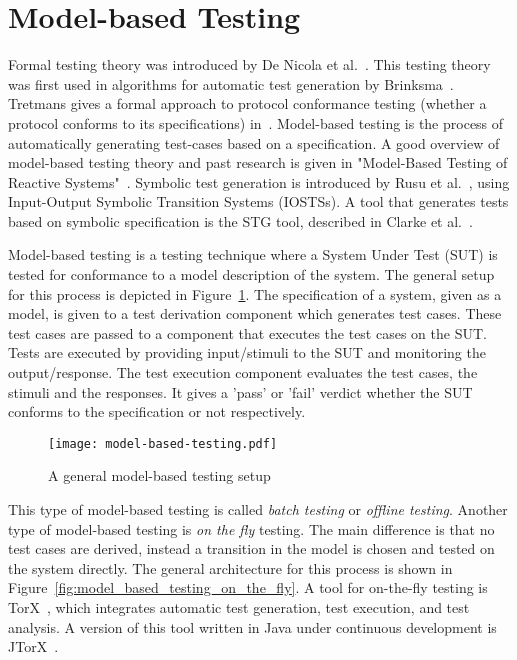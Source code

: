\section{Model-based Testing}\label{sec:model_based_testing}
Formal testing theory was introduced by De Nicola et al.~\cite{denicola:testing}. This testing theory was first used in algorithms for automatic test generation by Brinksma~\cite{brinksma:testing}. Tretmans gives a formal approach to protocol conformance testing (whether a protocol conforms to its specifications) in~\cite{Tretmans:conformancetesting}. Model-based testing is the process of automatically generating test-cases based on a specification. A good overview of model-based testing theory and past research is given in "Model-Based Testing of Reactive Systems"~\cite{Broy:ModelBasedTesting}.
Symbolic test generation is introduced by Rusu et al.~\cite{rusu:symbolic}, using Input-Output Symbolic Transition Systems (IOSTSs).
A tool that generates tests based on symbolic specification is the STG tool, described in Clarke et al.~\cite{clarke:STG}. %

Model-based testing is a testing technique where a System Under Test (SUT) is tested for conformance to a model description of the system. The general setup for this process is depicted in Figure~\ref{fig:model_based_testing}. The specification of a system, given as a model, is given to a test derivation component which generates test cases. These test cases are passed to a component that executes the test cases on the SUT. Tests are executed by providing input/stimuli to the SUT and monitoring the output/response. The test execution component evaluates the test cases, the stimuli and the responses. It gives a 'pass' or 'fail' verdict whether the SUT conforms to the specification or not respectively.

\begin{figure}[h]
  \begin{center}
    \texttt{[image: model-based-testing.pdf]}
  \end{center}
  \caption{A general model-based testing setup}
  \label{fig:model_based_testing}
\end{figure}

This type of model-based testing is called \textit{batch testing} or \textit{offline testing}. Another type of model-based testing is \textit{on the fly} testing. The main difference is that no test cases are derived, instead a transition in the model is chosen and tested on the system directly. The general architecture for this process is shown in Figure~\ref{fig:model_based_testing_on_the_fly}. A tool for on-the-fly testing is TorX~\cite{Tretmans:TorX}, which integrates automatic test generation, test execution, and test analysis. A version of this tool written in Java under continuous development is JTorX~\cite{Belinfante:JTorX}.

